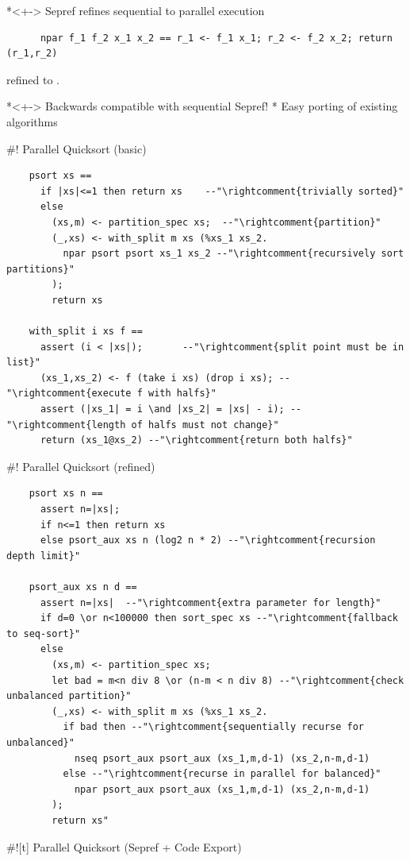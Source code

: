 \documentclass[fleqn]{beamer}
\begin{document}
  *<+-> Sepref refines sequential to parallel execution
    \begin{lstlisting}
      npar f_1 f_2 x_1 x_2 == r_1 <- f_1 x_1; r_2 <- f_2 x_2; return (r_1,r_2)
    \end{lstlisting}
    refined to .

  *<+-> Backwards compatible with sequential Sepref!
    * Easy porting of existing algorithms

#! Parallel Quicksort (basic)

  \begin{lstlisting}
    psort xs ==
      if |xs|<=1 then return xs    --"\rightcomment{trivially sorted}"
      else
        (xs,m) <- partition_spec xs;  --"\rightcomment{partition}"
        (_,xs) <- with_split m xs (%xs_1 xs_2.
          npar psort psort xs_1 xs_2 --"\rightcomment{recursively sort partitions}"
        );
        return xs

    with_split i xs f ==
      assert (i < |xs|);       --"\rightcomment{split point must be in list}"
      (xs_1,xs_2) <- f (take i xs) (drop i xs); --"\rightcomment{execute f with halfs}"
      assert (|xs_1| = i \and |xs_2| = |xs| - i); --"\rightcomment{length of halfs must not change}"
      return (xs_1@xs_2) --"\rightcomment{return both halfs}"

  \end{lstlisting}


#! Parallel Quicksort (refined)
  \small
  \begin{lstlisting}
    psort xs n ==
      assert n=|xs|;
      if n<=1 then return xs
      else psort_aux xs n (log2 n * 2) --"\rightcomment{recursion depth limit}"

    psort_aux xs n d ==
      assert n=|xs|  --"\rightcomment{extra parameter for length}"
      if d=0 \or n<100000 then sort_spec xs --"\rightcomment{fallback to seq-sort}"
      else
        (xs,m) <- partition_spec xs;
        let bad = m<n div 8 \or (n-m < n div 8) --"\rightcomment{check unbalanced partition}"
        (_,xs) <- with_split m xs (%xs_1 xs_2.
          if bad then --"\rightcomment{sequentially recurse for unbalanced}"
            nseq psort_aux psort_aux (xs_1,m,d-1) (xs_2,n-m,d-1)
          else --"\rightcomment{recurse in parallel for balanced}"
            npar psort_aux psort_aux (xs_1,m,d-1) (xs_2,n-m,d-1)
        );
        return xs"

  \end{lstlisting}

#![t] Parallel Quicksort (Sepref + Code Export)
  \small
\end{document}
